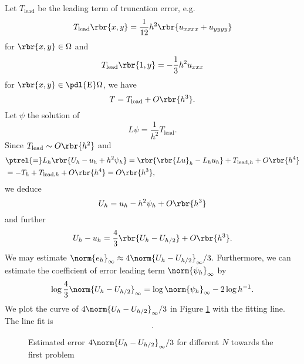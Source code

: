\documentclass[english, nochinese]{pnote}
\newcommand\normi[1]{\norm{#1}_{\infty}}
\begin{document}
Let $T_{\text{lead}}$ be the leading term of truncation error, e.g.
\begin{equation}
T_{\text{lead}} \rbr{ x, y } = \frac{1}{12} h^2 \rbr{ u_{ x x x x } + u_{ y y y y } }
\end{equation}
for $ \rbr{ x, y } \in \Omega $ and
\begin{equation}
T_{\text{lead}} \rbr{ 1, y } = -\frac{1}{3} h^2 u_{ x x x }
\end{equation}
for $ \rbr{ x, y } \in \pdl{\text{E}} \Omega $, we have
\begin{equation}
T = T_{\text{lead}} + O \rbr{h^3}.
\end{equation}
Let $\psi$ the solution of
\begin{equation}
L \psi = \frac{1}{h^2} T_{\text{lead}}.
\end{equation}
Since $ T_{\text{lead}} \sim O \rbr{h^2} $ and
\begin{equation}
\begin{split}
&\ptrel{=} L_h \rbr{ U_h - u_h + h^2 \psi_h } = \rbr{ \rbr{ L u }_h - L_h u_h } + T_{ \text{lead}, h } + O \rbr{h^4} \\
&= -T_h + T_{ \text{lead}, h } + O \rbr{h^4} = O \rbr{h^3},
\end{split}
\end{equation}
we deduce
\begin{equation}
U_h = u_h - h^2 \psi_h + O \rbr{h^3}
\end{equation}
and further
\begin{equation}
U_h - u_h = \frac{4}{3} \rbr{ U_h - U_{ h / 2 } } + O \rbr{h^3}.
\end{equation}
We may estimate $ \normi{e_h} \approx 4 \normi{ U_h - U_{ h / 2 } } / 3 $. Furthermore, we can estimate the coefficient of error leading term $\normi{\psi_h}$ by
\begin{equation}
\log \frac{4}{3} \normi{ U_h - U_{ h / 2 } } = \log \normi{\psi_h} - 2 \log h^{-1}.
\end{equation}
We plot the curve of $ 4 \normi{ U_h - U_{ h / 2 } } / 3 $ in Figure \ref{Fig:Prob1Post} with the fitting line. The line fit is
\begin{equation}
.
\end{equation}

\begin{figure}[htbp]
\centering

\caption{Estimated error $ 4 \normi{ U_h - U_{ h / 2 } } / 3 $ for different $N$ towards the first problem}
\label{Fig:Prob1Post}
\end{figure}
\end{document}
